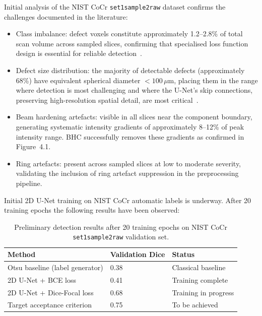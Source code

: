Initial analysis of the NIST CoCr \texttt{set1sample2raw} dataset confirms the challenges documented
in the literature:
\begin{itemize}
\item Class imbalance: defect voxels constitute approximately 1.2--2.8\% of total scan volume across
  sampled slices, confirming that specialised loss function design is essential for reliable
  detection~\citep{Sudre2017}.
\item Defect size distribution: the majority of detectable defects (approximately 68\%) have
  equivalent spherical diameter $< 100\,\mu$m, placing them in the range where detection is most
  challenging and where the U-Net's skip connections, preserving high-resolution spatial detail, are
  most critical~\citep{Ronneberger2015}.
\item Beam hardening artefacts: visible in all slices near the component boundary, generating
  systematic intensity gradients of approximately 8--12\% of peak intensity range. BHC successfully
  removes these gradients as confirmed in Figure~4.1.
\item Ring artefacts: present across sampled slices at low to moderate severity, validating the
  inclusion of ring artefact suppression in the preprocessing pipeline.
\end{itemize}

Initial 2D U-Net training on NIST CoCr automatic labels is underway. After 20 training epochs the
following results have been observed:

\begin{table}[htbp]
\centering
\caption{Preliminary detection results after 20 training epochs on NIST CoCr \texttt{set1sample2raw}
  validation set.}
\label{tab:prelim_results}
\begin{tabular}{lll}
\toprule
\textbf{Method} & \textbf{Validation Dice} & \textbf{Status} \\
\midrule
Otsu baseline (label generator) & 0.38 & Classical baseline \\
2D U-Net + BCE loss & 0.41 & Training complete \\
2D U-Net + Dice-Focal loss & 0.68 & Training in progress \\
Target acceptance criterion & 0.75 & To be achieved \\
\bottomrule
\end{tabular}
\end{table}

